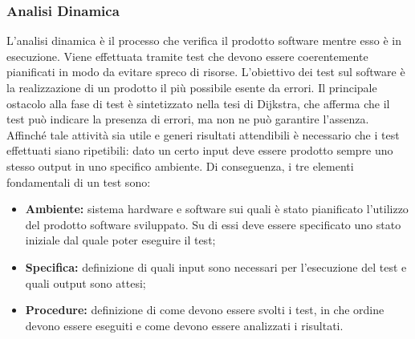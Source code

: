 \subsubsection{Analisi Dinamica}
    L'analisi dinamica è il processo che verifica il prodotto software mentre esso è in esecuzione. Viene effettuata tramite test che devono essere coerentemente pianificati in modo da evitare spreco di risorse.
    L'obiettivo dei test sul software è la realizzazione di un prodotto il più possibile esente da errori. Il principale ostacolo alla fase di test è sintetizzato nella tesi di Dijkstra, che afferma che il test può indicare la presenza di errori, ma non ne può garantire l'assenza.
Affinché tale attività sia utile e generi risultati attendibili è necessario che i test effettuati
siano ripetibili: dato un certo input deve essere prodotto sempre uno stesso output in
uno specifico ambiente. Di conseguenza, i tre elementi fondamentali di un test sono:
    \begin{itemize}
    \item \textbf{Ambiente: }sistema hardware e software sui quali è stato pianificato l'utilizzo del
prodotto software sviluppato. Su di essi deve essere specificato uno stato iniziale
dal quale poter eseguire il test;
    \item \textbf{Specifica: }definizione di quali input sono necessari per l'esecuzione del test e quali output sono attesi;
    \item \textbf{Procedure: }definizione di come devono essere svolti i test, in che ordine devono
essere eseguiti e come devono essere analizzati i risultati.
    \end{itemize}


